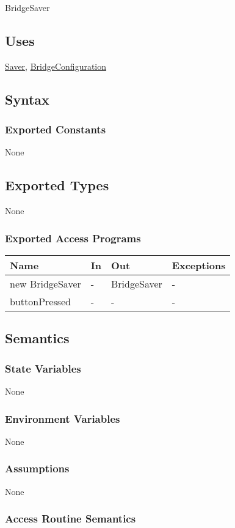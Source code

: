\documentclass[12pt, titlepage]{article}
\begin{document}
BridgeSaver

\subsection{Uses}
\hyperref[Saver]{Saver}, \hyperref[BridgeConfiguration]{BridgeConfiguration}

\subsection{Syntax}

\subsubsection{Exported Constants}
None
\subsection{Exported Types}
None

\subsubsection{Exported Access Programs}
\begin{center}
\begin{tabular}{p{5cm} p{2cm} p{4cm} p{5.5cm}}
\hline
\textbf{Name} & \textbf{In} & \textbf{Out} & \textbf{Exceptions} \\
\hline
new BridgeSaver & - & BridgeSaver & - \\
\hline
buttonPressed & - & - & - \\
\hline
\end{tabular}
\end{center}

\subsection{Semantics}

\subsubsection{State Variables}
None
\subsubsection{Environment Variables}
None
\subsubsection{Assumptions}
None
\subsubsection{Access Routine Semantics}
\end{document}
